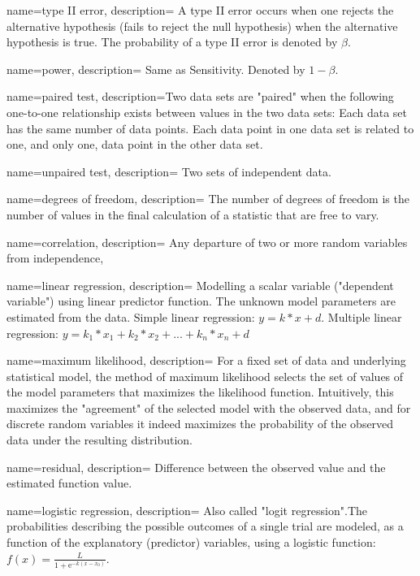 {
    name=type II error,
    description={ A type II error occurs when one rejects the alternative hypothesis (fails
    to reject the null hypothesis) when the alternative hypothesis is true.
    The probability of a type II error is denoted by $\beta$.}
}

{
    name=power,
    description={ Same as Sensitivity. Denoted by $1-\beta$.}
}

{
    name=paired test,
    description={Two data sets are "paired" when the following one-to-one
    relationship exists between values in the two data sets:
        Each data set has the same number of data points.
        Each data point in one data set is related to one, and only one, data
        point in the other data set.}
}

{
    name=unpaired test,
    description={ Two sets of independent data.}
}

{
    name=degrees of freedom,
    description={ The number of degrees of freedom is the number of values in the final
    calculation of a statistic that are free to vary.}
}

{
    name=correlation,
    description={ Any departure of two or more random variables from
    independence,}
}

{
    name=linear regression,
    description={ Modelling a scalar variable ("dependent variable") using linear predictor
    function. The unknown model parameters are estimated from the data.
    Simple linear regression: $y = k*x + d$.
    Multiple linear regression: $y = k_1*x_1 + k_2*x_2 + ... + k_n*x_n + d$}
}

{
    name=maximum likelihood,
    description={ For a fixed set of data and underlying statistical model, the
    method of maximum likelihood selects the set of values of the model
    parameters that maximizes the likelihood function. Intuitively, this
    maximizes the "agreement" of the selected model with the observed data,
    and for discrete random variables it indeed maximizes the probability of
    the observed data under the resulting distribution. }
}

{
    name=residual,
    description={ Difference between the observed value and the estimated
    function value.}
}

{
    name=logistic regression,
    description={ Also called "logit regression".The probabilities describing the possible
    outcomes of a single trial are modeled, as a function of the explanatory
    (predictor) variables, using a logistic function: $f(x) = \frac{L}{1 +
    \mathrm e^{-k(x-x_0)}}$.}
}

